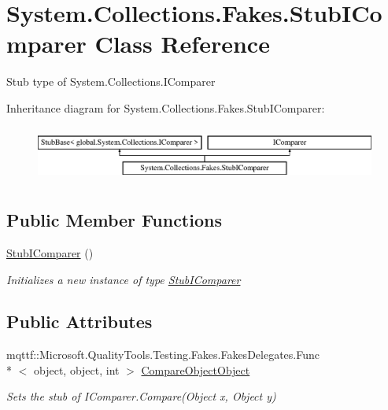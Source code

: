 \hypertarget{class_system_1_1_collections_1_1_fakes_1_1_stub_i_comparer}{\section{System.\-Collections.\-Fakes.\-Stub\-I\-Comparer Class Reference}
\label{class_system_1_1_collections_1_1_fakes_1_1_stub_i_comparer}
}


Stub type of System.\-Collections.\-I\-Comparer 


Inheritance diagram for System.\-Collections.\-Fakes.\-Stub\-I\-Comparer\-:\begin{figure}[H]
\begin{center}
\leavevmode
\includegraphics[height=1.842105cm]{class_system_1_1_collections_1_1_fakes_1_1_stub_i_comparer}
\end{center}
\end{figure}
\subsection*{Public Member Functions}
\begin{DoxyCompactItemize}
\item 
\hyperlink{class_system_1_1_collections_1_1_fakes_1_1_stub_i_comparer_a2ef7f237ada7459523dcb62c56d15b11}{Stub\-I\-Comparer} ()
\begin{DoxyCompactList}\small\item\em Initializes a new instance of type \hyperlink{class_system_1_1_collections_1_1_fakes_1_1_stub_i_comparer}{Stub\-I\-Comparer}\end{DoxyCompactList}\end{DoxyCompactItemize}
\subsection*{Public Attributes}
\begin{DoxyCompactItemize}
\item 
mqttf\-::\-Microsoft.\-Quality\-Tools.\-Testing.\-Fakes.\-Fakes\-Delegates.\-Func\\*
$<$ object, object, int $>$ \hyperlink{class_system_1_1_collections_1_1_fakes_1_1_stub_i_comparer_a1ee698706e3bf4e61b109991bb8cb060}{Compare\-Object\-Object}
\begin{DoxyCompactList}\small\item\em Sets the stub of I\-Comparer.\-Compare(\-Object x, Object y)\end{DoxyCompactList}\end{DoxyCompactItemize}


